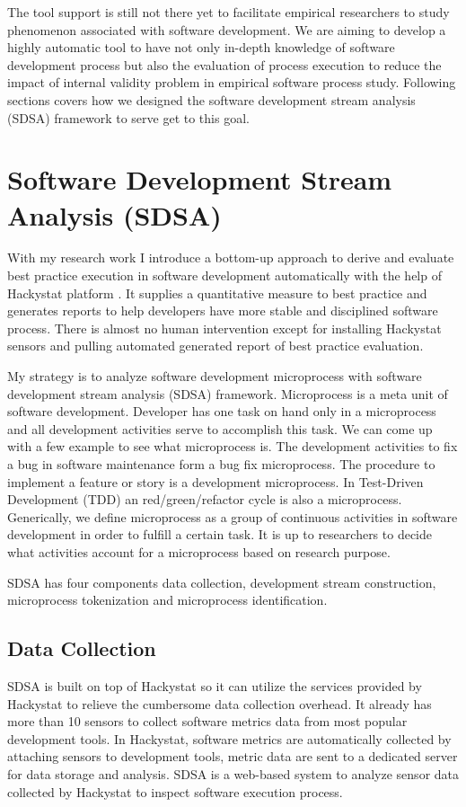 The tool support is still not there yet to facilitate empirical researchers
to study phenomenon associated with software development. We are aiming to
develop a highly automatic tool to have not only in-depth knowledge of
software development process but also the evaluation of process execution
to reduce the impact of internal validity problem in empirical software
process study. Following sections covers how we designed the software
development stream analysis (SDSA) framework to serve get to this goal.

\section{Software Development Stream Analysis (SDSA)}
\label{sec:sdsa}
With my research work I introduce a bottom-up approach to derive and
evaluate best practice execution in software development automatically with
the help of Hackystat platform \cite{csdl2-02-07}. It supplies a
quantitative measure to best practice and generates reports to help
developers have more stable and disciplined software process. There is
almost no human intervention except for installing Hackystat sensors and
pulling automated generated report of best practice evaluation.

My strategy is to analyze software development microprocess with software
development stream analysis (SDSA) framework.  Microprocess is a meta unit
of software development. Developer has one task on hand only in a
microprocess and all development activities serve to accomplish this task.
We can come up with a few example to see what microprocess is.  The
development activities to fix a bug in software maintenance form a bug fix
microprocess. The procedure to implement a feature or story is a
development microprocess. In Test-Driven Development (TDD) an
red/green/refactor cycle is also a microprocess. Generically, we define
microprocess as a group of continuous activities in software development in
order to fulfill a certain task. It is up to researchers to decide what
activities account for a microprocess based on research purpose.

SDSA has four components data collection, development stream construction,
microprocess tokenization and microprocess identification.

\subsection{Data Collection}
SDSA is built on top of Hackystat so it can utilize the services provided
by Hackystat\cite{csdl2-02-07} to relieve the cumbersome data collection
overhead. It already has more than 10 sensors to collect software metrics
data from most popular development tools. In Hackystat, software metrics
are automatically collected by attaching sensors to development tools,
metric data are sent to a dedicated server for data storage and analysis.
SDSA is a web-based system to analyze sensor data collected by Hackystat
to inspect software execution process. 

